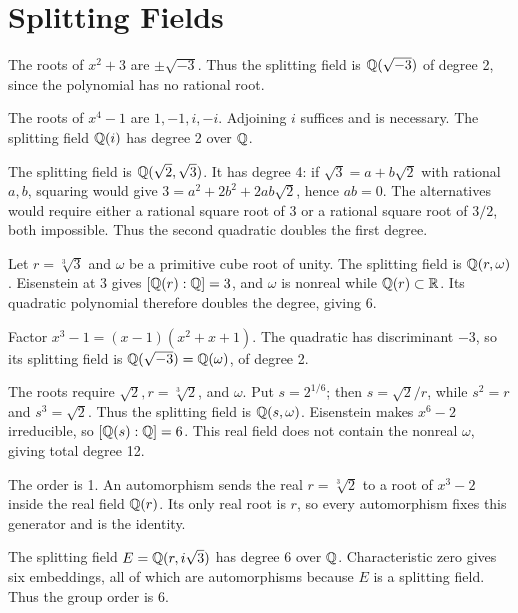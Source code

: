 \section{Splitting Fields}

The roots of $x^2+3$ are $\pm\sqrt{-3}$. Thus the splitting field is $\mathbb{Q}(\sqrt{-3})$ of degree 2, since the polynomial has no rational root.

The roots of $x^4-1$ are $1,-1,i,-i$. Adjoining $i$ suffices and is necessary. The splitting field $\mathbb{Q}(i)$ has degree 2 over $\mathbb{Q}$.

The splitting field is $\mathbb{Q}(\sqrt2,\sqrt3)$. It has degree 4: if $\sqrt3=a+b\sqrt2$ with rational $a,b$, squaring would give $3=a^2+2b^2+2ab\sqrt2$, hence $ab=0$. The alternatives would require either a rational square root of 3 or a rational square root of $3/2$, both impossible. Thus the second quadratic doubles the first degree.

Let $r=\sqrt[3]3$ and $\omega$ be a primitive cube root of unity. The splitting field is $\mathbb{Q}(r,\omega)$. Eisenstein at 3 gives $[\mathbb{Q}(r):\mathbb{Q}]=3$, and $\omega$ is nonreal while $\mathbb{Q}(r)\subset\mathbb{R}$. Its quadratic polynomial therefore doubles the degree, giving 6.

Factor $x^3-1=(x-1)(x^2+x+1)$. The quadratic has discriminant $-3$, so its splitting field is $\mathbb{Q}(\sqrt{-3})=\mathbb{Q}(\omega)$, of degree 2.

The roots require $\sqrt2,r=\sqrt[3]2$, and $\omega$. Put $s=2^{1/6}$; then $s=\sqrt2/r$, while $s^2=r$ and $s^3=\sqrt2$. Thus the splitting field is $\mathbb{Q}(s,\omega)$. Eisenstein makes $x^6-2$ irreducible, so $[\mathbb{Q}(s):\mathbb{Q}]=6$. This real field does not contain the nonreal $\omega$, giving total degree 12.

The order is 1. An automorphism sends the real $r=\sqrt[3]2$ to a root of $x^3-2$ inside the real field $\mathbb{Q}(r)$. Its only real root is $r$, so every automorphism fixes this generator and is the identity.

The splitting field $E=\mathbb{Q}(r,i\sqrt3)$ has degree 6 over $\mathbb{Q}$. Characteristic zero gives six embeddings, all of which are automorphisms because $E$ is a splitting field. Thus the group order is 6.

